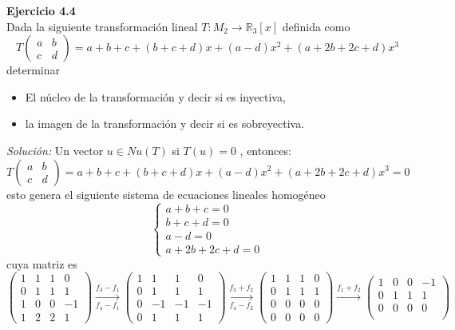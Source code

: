 \documentclass{article}
\newenvironment{problem}[2][Ejercicio]
    { \begin{mdframed}[backgroundcolor=gray!20] \textbf{#1 #2} \\}
    {  \end{mdframed}}
\newenvironment{solution}
    {\textit{Solución:}}
    {}
\begin{document}
\begin{problem}{4.4}
    Dada la siguiente transformación lineal $T : M_2 \to \mathbb{R}_3[x]$ definida como
\[
T  \begin{pmatrix} a & b \\ c & d \end{pmatrix} = 
a+b+c+(b+c+d)x+(a-d)x^2+(a+2b+2c+d)x^3
\]
determinar
\begin{itemize}
\item 
El núcleo de la transformación y decir si es inyectiva,
\item 
la imagen de la transformación y decir si es sobreyectiva.
\end{itemize}
\end{problem}
\begin{solution}
    Un vector $u \in Nu(T)$ si $T(u)=0$ , entonces:
\[
T  \begin{pmatrix} a & b \\ c & d \end{pmatrix} = 
a+b+c+(b+c+d)x+(a-d)x^2+(a+2b+2c+d)x^3 = 0
\]
esto genera el siguiente sistema de ecuaciones lineales homogéneo
\[
\begin{cases}
a+b+c =0 \\
b+c+d = 0 \\
a-d = 0 \\
a+2b+2c+d = 0
\end{cases}
\]
cuya matriz es
\[
\begin{pmatrix}
1 & 1 & 1 & 0 \\
0 & 1 & 1 & 1 \\
1 & 0 & 0 & -1 \\
1 & 2 & 2 & 1
\end{pmatrix} \xrightarrow[f_4-f_1]{f_3-f_1}
\begin{pmatrix}
1 & 1 & 1 & 0 \\
0 & 1 & 1 & 1 \\
0 & -1 & -1 & -1 \\
0 & 1 & 1 & 1
\end{pmatrix} \xrightarrow[f_4-f_2]{f_3+f_2}
\begin{pmatrix}
1 & 1 & 1 & 0 \\
0 & 1 & 1 & 1 \\
0 & 0 & 0 & 0 \\
0 & 0 & 0 & 0
\end{pmatrix} \xrightarrow{f_1+f_2}
\begin{pmatrix}
1 & 0 & 0 & -1 \\
0 & 1 & 1 & 1 \\
0 & 0 & 0 & 0 \\

\end{pmatrix}\]
\end{solution}
\end{document}
